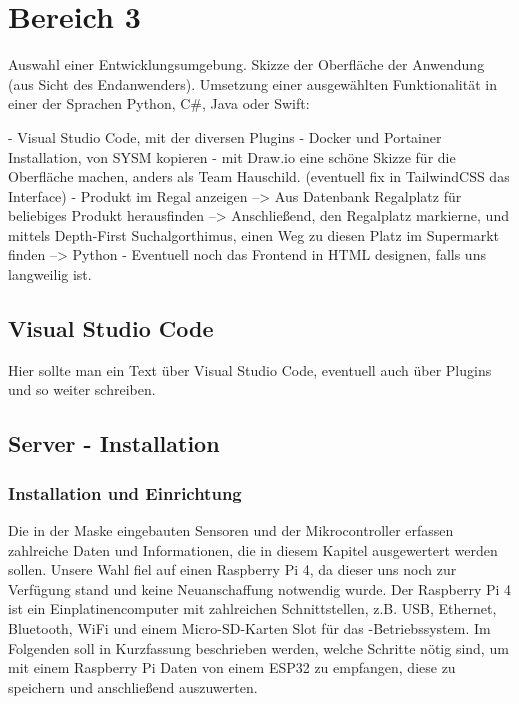 \section{Bereich 3}
Auswahl einer Entwicklungsumgebung.
Skizze der Oberfläche der Anwendung (aus Sicht des Endanwenders).
Umsetzung einer ausgewählten Funktionalität in einer der Sprachen Python, C\#, Java oder Swift:

- Visual Studio Code, mit der diversen Plugins
- Docker und Portainer Installation, von SYSM kopieren
- mit Draw.io eine schöne Skizze für die Oberfläche machen, anders als Team Hauschild. (eventuell fix in TailwindCSS das Interface)
- Produkt im Regal anzeigen --> Aus Datenbank Regalplatz für beliebiges Produkt herausfinden --> Anschließend, den Regalplatz markierne, und mittels Depth-First Suchalgorthimus, einen Weg zu diesen Platz im Supermarkt finden --> Python
- Eventuell noch das Frontend in HTML designen, falls uns langweilig ist.


\subsection{Visual Studio Code}
Hier sollte man ein Text über Visual Studio Code, eventuell auch über Plugins und so weiter schreiben.


\subsection{Server - Installation}
\label{sec:raspi}
\subsubsection{Installation und Einrichtung}
Die in der Maske eingebauten Sensoren und der Mikrocontroller erfassen zahlreiche Daten und Informationen, die in diesem Kapitel ausgewertert werden sollen.
Unsere Wahl fiel auf einen Raspberry Pi 4, da dieser uns noch zur Verfügung stand und keine Neuanschaffung notwendig wurde.
Der Raspberry Pi 4 ist ein Einplatinencomputer mit zahlreichen Schnittstellen, z.B. USB, Ethernet, Bluetooth, WiFi und einem Micro-SD-Karten Slot für das -Betriebssystem.
Im Folgenden soll in Kurzfassung beschrieben werden, welche Schritte nötig sind, um mit einem Raspberry Pi Daten von einem ESP32 zu empfangen, diese zu speichern und anschließend auszuwerten.

